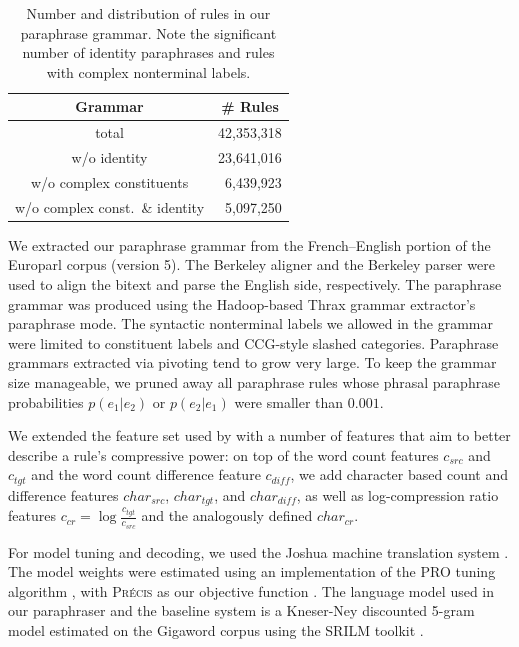 \documentclass[11pt]{article}
\begin{document}
\begin{table}
\small
\begin{center}
\begin{tabular}{|c|r|}
  \hline
  Grammar & \multicolumn{1}{c|}{\# Rules} \\
  \hline
  total & 42,353,318 \\
  w/o identity & 23,641,016 \\
  w/o complex constituents & 6,439,923 \\
  w/o complex const.\ \& identity & 5,097,250 \\
  \hline
\end{tabular}
\end{center}
\normalsize
\caption{Number and distribution of rules in our paraphrase
  grammar. Note the significant number of identity paraphrases and
  rules with complex nonterminal labels.}
\label{grammar_stats}
\end{table}

We extracted our paraphrase grammar from the French--English portion
of the Europarl corpus (version 5). The Berkeley aligner and the
Berkeley parser were used to align the bitext and parse the English
side, respectively. The paraphrase grammar was produced using the
Hadoop-based Thrax grammar extractor's paraphrase mode. The syntactic
nonterminal labels we allowed in the grammar were limited to
constituent labels and CCG-style slashed categories. Paraphrase
grammars extracted via pivoting tend to grow very large. To keep the
grammar size manageable, we pruned away all paraphrase rules whose
phrasal paraphrase probabilities $p(e_1|e_2)$ or $p(e_2|e_1)$ were
smaller than $0.001$.

We extended the feature set used by  with a
number of features that aim to better describe a rule's compressive
power: on top of the word count features $c_{\mathit{src}}$ and
$c_{\mathit{tgt}}$ and the word count difference feature
$c_{\mathit{diff}}$, we add character based count and difference
features $\mathit{char}_{\mathit{src}}$,
$\mathit{char}_{\mathit{tgt}}$, and $\mathit{char}_{\mathit{diff}}$,
as well as log-compression ratio features $c_{\mathit{cr}} = \log
\frac{c_{\mathit{tgt}}}{c_{\mathit{src}}}$ and the analogously defined
$\mathit{char}_{\mathit{cr}}$.

For model tuning and decoding, we used the Joshua machine translation
system \cite{Joshua-3.0}. The model weights were estimated using an
implementation of the PRO tuning algorithm \cite{PRO2011}, with
\textsc{Pr\'ecis} as our objective function \cite{Ganitkevitch2011}.  The
language model used in our paraphraser and the 
baseline system is a Kneser-Ney discounted 5-gram model estimated on
the Gigaword corpus using the SRILM toolkit \cite{SRILM}.
\end{document}
